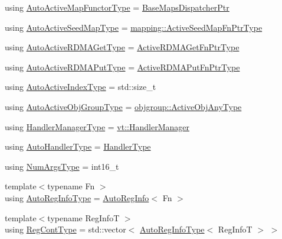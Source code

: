 \begin{DoxyCompactItemize}
\item 
using \hyperlink{namespacevt_1_1auto__registry_a05a587ebd105ed89932361888de7e4ae}{Auto\+Active\+Map\+Functor\+Type} = \hyperlink{namespacevt_1_1auto__registry_aacf403872e2d1ae4d749738c02904c01}{Base\+Maps\+Dispatcher\+Ptr}
\item 
using \hyperlink{namespacevt_1_1auto__registry_a9b5f3bdf0a9a503806cfd4f2747c82f6}{Auto\+Active\+Seed\+Map\+Type} = \hyperlink{namespacevt_1_1mapping_a254b50d55be91c3bd002481b2e96da7e}{mapping\+::\+Active\+Seed\+Map\+Fn\+Ptr\+Type}
\item 
using \hyperlink{namespacevt_1_1auto__registry_a039813f93a5804c77ae612e0318fb335}{Auto\+Active\+R\+D\+M\+A\+Get\+Type} = \hyperlink{namespacevt_ae4fbf97da623bfcd09ee8379de756257}{Active\+R\+D\+M\+A\+Get\+Fn\+Ptr\+Type}
\item 
using \hyperlink{namespacevt_1_1auto__registry_a1f67d3efa37b61040b56258ca59df088}{Auto\+Active\+R\+D\+M\+A\+Put\+Type} = \hyperlink{namespacevt_a23220eaaee4345f7371d35e3aee23c70}{Active\+R\+D\+M\+A\+Put\+Fn\+Ptr\+Type}
\item 
using \hyperlink{namespacevt_1_1auto__registry_ad5ff1c3344b954a1e1212c72c74e4a7a}{Auto\+Active\+Index\+Type} = std\+::size\+\_\+t
\item 
using \hyperlink{namespacevt_1_1auto__registry_a861d9d01e89c81f0a955188724aa25b3}{Auto\+Active\+Obj\+Group\+Type} = \hyperlink{namespacevt_1_1objgroup_a25bec5d3c8e8bb02b62280eec62b8ac7}{objgroup\+::\+Active\+Obj\+Any\+Type}
\item 
using \hyperlink{namespacevt_1_1auto__registry_a6014637a7590cbfcd2884a23c3e5b576}{Handler\+Manager\+Type} = \hyperlink{structvt_1_1_handler_manager}{vt\+::\+Handler\+Manager}
\item 
using \hyperlink{namespacevt_1_1auto__registry_ae295e18699146815bb7d7674594d95d7}{Auto\+Handler\+Type} = \hyperlink{namespacevt_af64846b57dfcaf104da3ef6967917573}{Handler\+Type}
\item 
using \hyperlink{namespacevt_1_1auto__registry_aebda1d9d765bc9147dc654ad0712c936}{Num\+Args\+Type} = int16\+\_\+t
\item 
{\footnotesize template$<$typename Fn $>$ }\\using \hyperlink{namespacevt_1_1auto__registry_af3f78826dd69454aeb914a3c7bec0a52}{Auto\+Reg\+Info\+Type} = \hyperlink{structvt_1_1auto__registry_1_1_auto_reg_info}{Auto\+Reg\+Info}$<$ Fn $>$
\item 
{\footnotesize template$<$typename Reg\+InfoT $>$ }\\using \hyperlink{namespacevt_1_1auto__registry_a988a4943e4c8fe82b56f5b13bddceb2b}{Reg\+Cont\+Type} = std\+::vector$<$ \hyperlink{namespacevt_1_1auto__registry_af3f78826dd69454aeb914a3c7bec0a52}{Auto\+Reg\+Info\+Type}$<$ Reg\+InfoT $>$ $>$

\end{DoxyCompactItemize}
